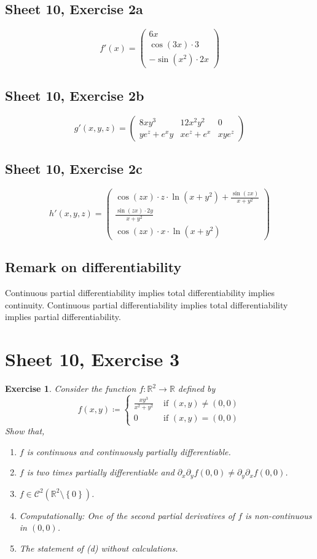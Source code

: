 \documentclass{article}
\newtheorem{ex}{Exercise} %
\newcommand{\set}[1]{\left\{#1\right\}}
\begin{document}
\subsection{Sheet 10, Exercise 2a}
\[ f'(x) = \begin{pmatrix} 6x \\ \cos(3x) \cdot 3 \\ -\sin(x^2) \cdot 2x \end{pmatrix} \]

\subsection{Sheet 10, Exercise 2b}
\[ g'(x, y, z) = \begin{pmatrix} 8xy^3 & 12 x^2 y^2 & 0 \\ ye^z + e^xy & xe^z + e^x & xye^z \end{pmatrix} \]

\subsection{Sheet 10, Exercise 2c}
\[ h'(x, y, z) = \begin{pmatrix} \cos(zx) \cdot z \cdot \ln(x + y^2) + \frac{\sin(zx)}{x + y^2} \\ \frac{\sin(zx) \cdot 2y}{x + y^2} \\ \cos(zx) \cdot x \cdot \ln(x + y^2) \end{pmatrix} \]

\subsection{Remark on differentiability}
Continuous partial differentiability implies total differentiability implies continuity.
Continuous partial differentiability implies total differentiability implies partial differentiability.

\section{Sheet 10, Exercise 3}
\begin{ex}
  Consider the function $f: \mathbb R^2 \to \mathbb R$ defined by
  \[ f(x, y) \coloneqq \begin{cases} \frac{xy^3}{x^2 + y^2} & \text{ if } (x, y) \neq (0, 0) \\ 0 & \text{ if } (x, y) = (0, 0) \end{cases} \]
  Show that,
  \begin{enumerate}
    \item $f$ is continuous and continuously partially differentiable.
    \item $f$ is two times partially differentiable and $\partial_x \partial_y f(0, 0) \neq \partial_y \partial_x f(0, 0)$.
    \item $f \in \mathcal C^2(\mathbb R^2 \setminus \set{0})$.
    \item Computationally: One of the second partial derivatives of $f$ is non-continuous in $(0, 0)$.
    \item The statement of (d) without calculations.
  \end{enumerate}
\end{ex}
\end{document}

